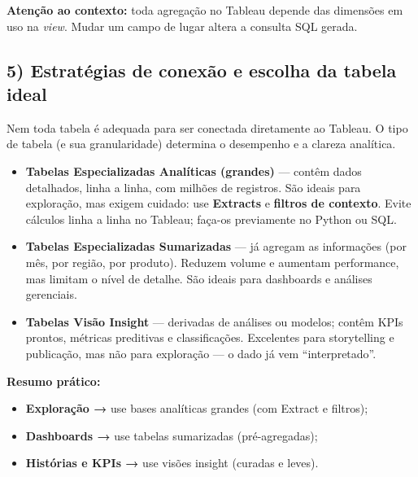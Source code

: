 \begin{NoteBox}
\textbf{Atenção ao contexto:} toda agregação no Tableau depende das dimensões em uso na \textit{view}.  
Mudar um campo de lugar altera a consulta SQL gerada.
\end{NoteBox}

\subsection*{5) Estratégias de conexão e escolha da tabela ideal}
Nem toda tabela é adequada para ser conectada diretamente ao Tableau.  
O tipo de tabela (e sua granularidade) determina o desempenho e a clareza analítica.

\begin{itemize}[leftmargin=*]
  \item \textbf{Tabelas Especializadas Analíticas (grandes)} — contêm dados detalhados, linha a linha, com milhões de registros.  
  São ideais para exploração, mas exigem cuidado: use \textbf{Extracts} e \textbf{filtros de contexto}.  
  Evite cálculos linha a linha no Tableau; faça-os previamente no Python ou SQL.

  \item \textbf{Tabelas Especializadas Sumarizadas} — já agregam as informações (por mês, por região, por produto).  
  Reduzem volume e aumentam performance, mas limitam o nível de detalhe.  
  São ideais para dashboards e análises gerenciais.

  \item \textbf{Tabelas Visão Insight} — derivadas de análises ou modelos; contêm KPIs prontos, métricas preditivas e classificações.  
  Excelentes para storytelling e publicação, mas não para exploração — o dado já vem “interpretado”.
\end{itemize}

\begin{NoteBox}
\textbf{Resumo prático:}\\[4pt]
\begin{itemize}[leftmargin=*]
  \item \textbf{Exploração →} use bases analíticas grandes (com Extract e filtros);\\
  \item \textbf{Dashboards →} use tabelas sumarizadas (pré-agregadas);\\
  \item \textbf{Histórias e KPIs →} use visões insight (curadas e leves).
\end{itemize}
\end{NoteBox}

